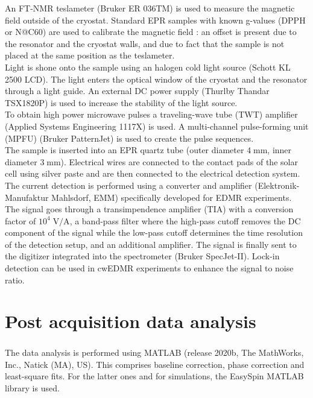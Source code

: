 \documentclass[a4paper]{book}
\begin{document}
	An FT-NMR teslameter (Bruker ER 036TM) is used to measure the magnetic field outside of the cryostat. Standard EPR samples with known g-values (DPPH or N@C60) are used to calibrate the magnetic field \cite{pfluegerEndohedralAtomicNitrogen2012}: an offset is present due to the resonator and the cryostat walls, and due to fact that the sample is not placed at the same position as the teslameter.\\
	Light is shone onto the sample using an halogen cold light source (Schott KL 2500 LCD). The light enters the optical window of the cryostat and the resonator through a light guide. An external DC power supply (Thurlby Thandar TSX1820P) is used to increase the stability of the light source.\\
	To obtain high power microwave pulses a traveling-wave tube (TWT) amplifier (Applied Systems Engineering 1117X) is used. A multi-channel pulse-forming unit (MPFU) (Bruker PatternJet) is used to create the pulse sequences.\\
	The sample is inserted into an EPR quartz tube (outer diameter $4 \; \text{mm}$, inner diameter $3 \; \text{mm}$). Electrical wires are connected to the contact pads of the solar cell using silver paste and are then connected to the electrical detection system. \\
	The current detection is performed using a converter and amplifier (Elektronik-Manufaktur Mahlsdorf, EMM) specifically developed for EDMR experiments. The signal goes through a transimpendence amplifier (TIA) with a conversion factor of $10^4 \; \text{V/A}$, a band-pass filter where the high-pass cutoff removes the DC component of the signal while the low-pass cutoff determines the time resolution of the detection setup, and an additional amplifier. The signal is finally sent to the digitizer integrated into the spectrometer (Bruker SpecJet-II). Lock-in detection can be used in cwEDMR experiments to enhance the signal to noise ratio.\\
	
	\section{Post acquisition data analysis}
	The data analysis is performed using MATLAB\textsuperscript{\textcopyright} (release 2020b, The MathWorks, Inc., Natick (MA), US). This comprises baseline correction, phase correction and least-square fits. For the latter ones and for simulations, the EasySpin \cite{stollEasySpinComprehensiveSoftware2006} MATLAB library is used.\\
\end{document}
